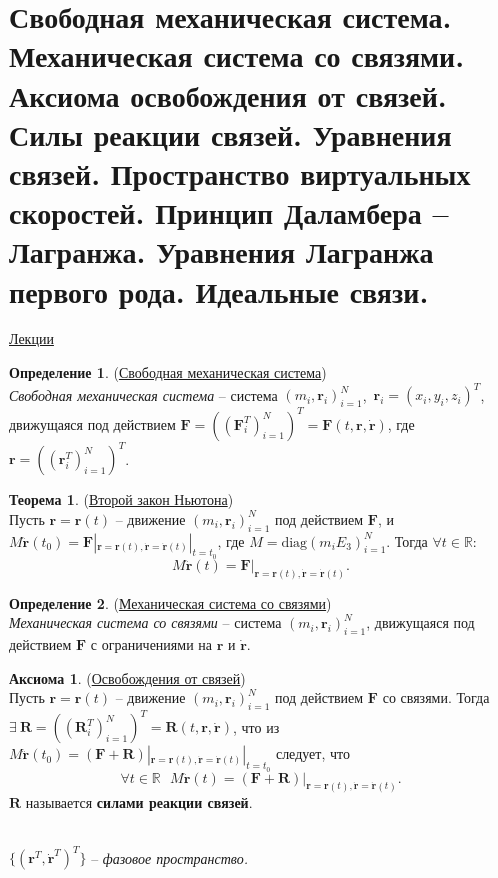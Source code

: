 \documentclass[specialist, subf, href, colorlinks=true, 12pt, times, mtpro, final]{disser}
\theoremstyle{definition}
\newtheorem{defn}{Определение}[section]
\newtheorem{theorem}{Теорема}[section]
\newtheorem{axiom}{Аксиома}[section]
\def\bfr{\mathbf{r}}
\def\bfrd{\dot{\bfr}}
\def\bfrdd{\ddot{\bfr}}
\def\bfF{\mathbf{F}}
\def\bfR{\mathbf{R}}
\begin{document}
    \section{Свободная механическая система. Механическая система со связями. Аксиома освобождения от связей. Силы реакции связей. Уравнения связей. Пространство виртуальных скоростей. Принцип Даламбера – Лагранжа. Уравнения Лагранжа первого рода. Идеальные связи.}
    \label{1}
    \hyperlink {first_lects.1}{Лекции}
    \begin{defn} (\hyperlink{first_lects.1}{Свободная механическая система})\\
    {\it Свободная механическая система} -- система $(m_i, \bfr_i)_{i=1}^N$,\ 
    $\bfr_i = (x_i, y_i, z_i)^T$, движущаяся под действием $\bfF = \left((\bfF_i^T)_{i=1}^N\right)^T
    = \bfF(t,\bfr,\bfrd)$, где $\bfr = \left((\bfr_i^T)_{i=1}^N\right)^T$.
    \end{defn}
    \begin{theorem} (\hyperlink{first_lects.1}{Второй закон Ньютона})\\
    Пусть $\bfr=\bfr(t)$ -- движение $(m_i, \bfr_i)_{i=1}^N$ под действием $\bfF$,
    и $M\bfrdd(t_0) = \bfF|_{\bfr = \bfr(t), \bfrd=\bfrd(t)}|_{t=t_0}$, где
    $M = \text{diag}(m_iE_3)_{i=1}^N$. Тогда $\forall t \in \mathbb{R}$:
    $$M\bfrdd(t) = \bfF|_{\bfr=\bfr(t), \bfrd = \bfrd(t)}.$$
    \end{theorem}
    \begin{defn} (\hyperlink{first_lects.1}{Механическая система со связями})\\
    {\it Механическая система со связями} -- система $(m_i, \bfr_i)_{i=1}^N$, движущаяся под
    действием $\bfF$ с ограничениями на $\bfr$ и $\bfrd$.
    \end{defn}
    \begin{axiom} (\hyperlink{first_lects.1}{Освобождения от связей})\\
    Пусть $\bfr=\bfr(t)$ -- движение $(m_i, \bfr_i)_{i=1}^N$ под действием $\bfF$ со
    связями. Тогда $\exists\  \bfR=\left((\bfR_i^T)_{i=1}^N\right)^T = \bfR(t,\bfr,\bfrd)$,
    что из $M\bfrdd(t_0) = (\bfF + \bfR)|_{\bfr = \bfr(t), \bfrd=\bfrd(t)}|_{t=t_0}$
    следует, что
    $$\forall t \in \mathbb{R}\ \ \ M\bfrdd(t) = (\bfF + \bfR)|_{\bfr = \bfr(t), \bfrd=\bfrd(t)}.$$
    $\bfR$ называется {\bf силами реакции связей}.
    \end{axiom}
    \\
    $\{(\bfr^T, \bfrd^T)^T\}$ -- {\it фазовое пространство.}\\
\end{document}
